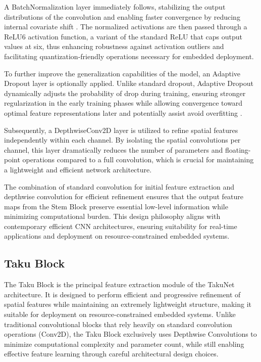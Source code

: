 A BatchNormalization layer immediately follows, stabilizing the output distributions of the convolution and enabling faster convergence by reducing internal covariate shift \cite{BatchNorm}. The normalized activations are then passed through a ReLU6 activation function, a variant of the standard ReLU that caps output values at six, thus enhancing robustness against activation outliers and facilitating quantization-friendly operations necessary for embedded deployment.

To further improve the generalization capabilities of the model, an Adaptive Dropout layer is optionally applied. Unlike standard dropout, Adaptive Dropout dynamically adjusts the probability of drop during training, ensuring stronger regularization in the early training phases while allowing convergence toward optimal feature representations later and potentially assist avoid overfitting \cite{Dropout} .

Subsequently, a DepthwiseConv2D layer is utilized to refine spatial features independently within each channel. By isolating the spatial convolutions per channel, this layer dramatically reduces the number of parameters and floating-point operations compared to a full convolution, which is crucial for maintaining a lightweight and efficient network architecture.

The combination of standard convolution for initial feature extraction and depthwise convolution for efficient refinement ensures that the output feature maps from the Stem Block preserve essential low-level information while minimizing computational burden. This design philosophy aligns with contemporary efficient CNN architectures, ensuring suitability for real-time applications and deployment on resource-constrained embedded systems\cite{chollet2017xception}.

\subsection{Taku Block}

    The Taku Block is the principal feature extraction module of the TakuNet architecture. It is designed to perform efficient and progressive refinement of spatial features while maintaining an extremely lightweight structure, making it suitable for deployment on resource-constrained embedded systems. 
    Unlike traditional convolutional blocks that rely heavily on standard convolution operations (Conv2D), the Taku Block exclusively uses Depthwise Convolutions to minimize computational complexity and parameter count, while still enabling effective feature learning through careful architectural design choices.
    
